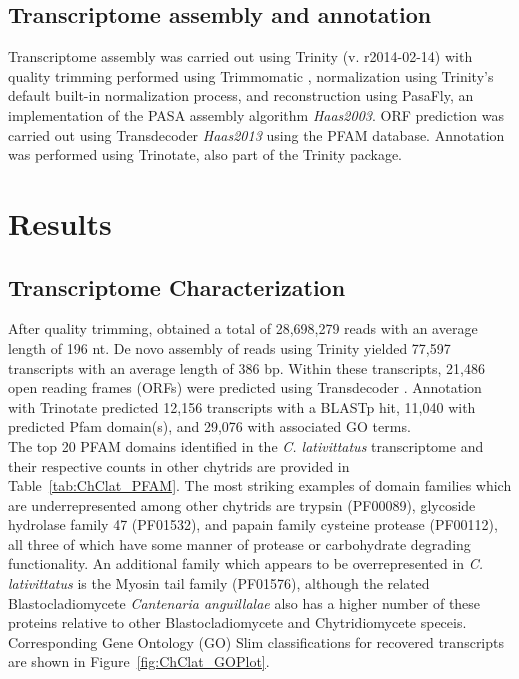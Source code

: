 \subsection*{Transcriptome assembly and annotation}
Transcriptome assembly was carried out using Trinity (v. r2014-02-14) \cite{Grabherr2011} with quality trimming performed using Trimmomatic \cite{Bolger2014}, normalization using Trinity’s default built-in normalization process, and reconstruction using PasaFly, an implementation of the PASA assembly algorithm \textit{Haas2003}. ORF prediction was carried out using Transdecoder \textit{Haas2013} using the PFAM database. Annotation was performed using Trinotate, also part of the Trinity package.\\
\section{Results}
\subsection*{Transcriptome Characterization}
After quality trimming, obtained a total of 28,698,279 reads with an average length of 196 nt. De novo assembly of reads using Trinity \cite{Grabherr2011} yielded 77,597 transcripts with an average length of 386 bp. Within these transcripts, 21,486 open reading frames (ORFs) were predicted using Transdecoder \cite{Haas2013}. Annotation with Trinotate predicted 12,156 transcripts with a BLASTp hit, 11,040 with predicted Pfam domain(s), and 29,076 with associated GO terms. \\
\indent The top 20 PFAM domains identified in the \textit{C. lativittatus} transcriptome and their respective counts in other chytrids are provided in Table~\ref{tab:ChClat_PFAM}. The most striking examples of domain families which are underrepresented among other chytrids are trypsin (PF00089), glycoside hydrolase family 47 (PF01532), and papain family cysteine protease (PF00112), all three of which have some manner of protease or carbohydrate degrading functionality. An additional family which appears to be overrepresented in \textit{C. lativittatus} is the Myosin tail family (PF01576), although the related Blastocladiomycete \textit{Cantenaria anguillalae} also has a higher number of these proteins relative to other Blastocladiomycete and Chytridiomycete speceis. Corresponding Gene Ontology (GO) Slim classifications for recovered transcripts are shown in Figure~\ref{fig:ChClat_GOPlot}. \\
